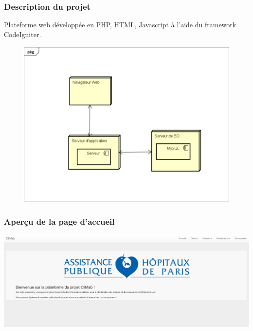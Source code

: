 \documentclass{beamer}
\begin{document}
\begin{frame}
\frametitle{Description du projet}

Plateforme web développée en PHP, HTML, Javascript à l'aide du framework CodeIgniter.


\begin{figure}
	\includegraphics[scale=0.45]{images/deploiement}
\end{figure}

\end{frame}

\begin{frame}
\frametitle{Aperçu de la page d'accueil}

\begin{center}
	\includegraphics[scale=0.28]{images/accueil}
\end{center}

\end{frame}
\end{document}
